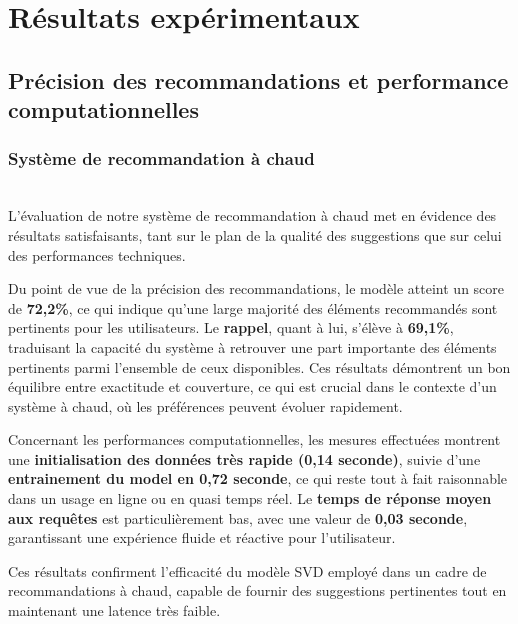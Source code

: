 \documentclass{article}
\begin{document}
\section{Résultats expérimentaux}
\subsection{Précision des recommandations et performance computationnelles}
\subsubsection{Système de recommandation à chaud}
$ $\\
L’évaluation de notre système de recommandation à chaud met en évidence des résultats satisfaisants, tant sur le plan de la qualité des suggestions que sur celui des performances techniques.

Du point de vue de la précision des recommandations, le modèle atteint un score de \textbf{72,2\%}, ce qui indique qu’une large majorité des éléments recommandés sont pertinents pour les utilisateurs. Le \textbf{rappel}, quant à lui, s’élève à \textbf{69,1\%}, traduisant la capacité du système à retrouver une part importante des éléments pertinents parmi l’ensemble de ceux disponibles. Ces résultats démontrent un bon équilibre entre exactitude et couverture, ce qui est crucial dans le contexte d’un système à chaud, où les préférences peuvent évoluer rapidement.

Concernant les performances computationnelles, les mesures effectuées montrent une \textbf{initialisation des données très rapide (0,14 seconde)}, suivie d’une \textbf{entrainement du model en 0,72 seconde}, ce qui reste tout à fait raisonnable dans un usage en ligne ou en quasi temps réel. Le \textbf{temps de réponse moyen aux requêtes} est particulièrement bas, avec une valeur de \textbf{0,03 seconde}, garantissant une expérience fluide et réactive pour l’utilisateur.

Ces résultats confirment l’efficacité du modèle SVD employé dans un cadre de recommandations à chaud, capable de fournir des suggestions pertinentes tout en maintenant une latence très faible.
\end{document}

